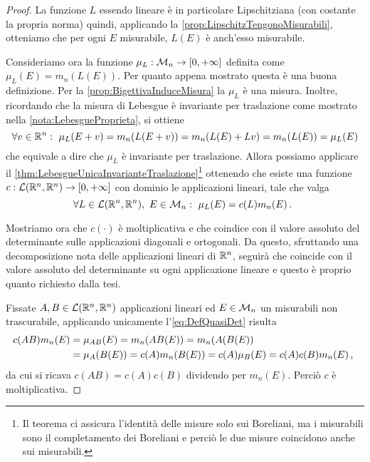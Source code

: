 \begin{proof}
	La funzione $L$ essendo lineare è in particolare Lipschitziana (con costante la propria norma) quindi, applicando la \cref{prop:LipschitzTengonoMisurabili}, otteniamo che per ogni $E$ misurabile, $L(E)$ è anch'esso misurabile.
	
	Consideriamo ora la funzione $\mu_L:\mathcal M_n\to[0,+\infty]$ definita come $\mu_L(E)=m_n(L(E))$. Per quanto appena mostrato questa è una buona definizione.
	Per la \cref{prop:BigettivaInduceMisura} la $\mu_L$ è una misura.
	Inoltre, ricordando che la misura di Lebesgue è invariante per traslazione come mostrato nella \cref{nota:LebesgueProprieta}, si ottiene
	\begin{equation*}
		\forall v\in\R^n:\ \mu_L(E+v)=m_n(L(E+v))=m_n(L(E)+Lv)=m_n(L(E))=\mu_L(E)
	\end{equation*}
	che equivale a dire che $\mu_L$ è invariante per traslazione.
	\newcommand{\linR}{\ensuremath{\mathcal L(\R^n,\R^n)}}
	Allora possiamo applicare il \cref{thm:LebesgueUnicaInvarianteTraslazione}\footnote{Il teorema ci assicura l'identità delle misure solo sui Boreliani, ma i misurabili sono il completamento dei Boreliani e perciò le due misure coincidono anche sui misurabili.} ottenendo che esiste una funzione $c:\linR\to\Rpiu$ con dominio le applicazioni lineari, tale che valga
	\begin{equation}\label{eq:DefQuasiDet}
		\forall L\in \linR,\ E\in\M_n:\ \mu_L(E)=c(L)m_n(E)\punto
	\end{equation}
	
	Mostriamo ora che $c(\cdot)$ è moltiplicativa e che coindice con il valore assoluto del determinante sulle applicazioni diagonali e ortogonali. Da questo, sfruttando una decomposizione nota delle applicazioni lineari di $\mathbb R^n$, seguirà che coincide con il valore assoluto del determinante su ogni applicazione lineare e questo è proprio quanto richiesto dalla tesi. 
	
	Fissate $A,B\in \linR$ applicazioni lineari ed $E\in\mathcal M_n$ un misurabili non trascurabile, applicando unicamente l'\cref{eq:DefQuasiDet} risulta
	\begin{align*}
		c(AB)m_n(E)&=\mu_{AB}(E)=m_n(AB(E))=m_n(A(B(E))\\
		&=\mu_A(B(E))=c(A)m_n(B(E))=c(A)\mu_B(E)=c(A)c(B)m_n(E)\, \text{, }
	\end{align*}
	da cui si ricava $c(AB)=c(A)c(B)$ dividendo per $m_n(E)$. Perciò $c$ è moltiplicativa.
	

\end{proof}
